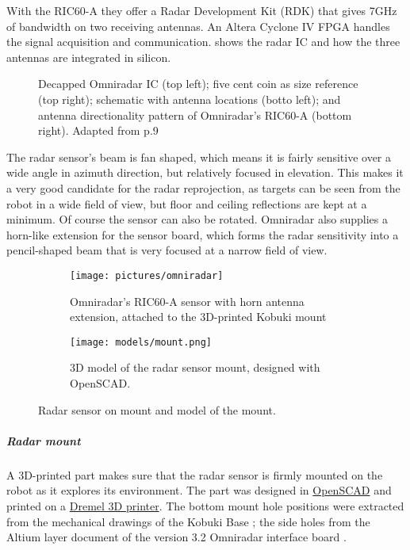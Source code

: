 With the RIC60-A they offer a Radar Development Kit (RDK) that gives
7GHz of bandwidth on two receiving antennas. An Altera Cyclone IV FPGA
handles the signal acquisition and communication.  shows the
radar IC and how the three antennas are integrated in silicon.

\begin{figure}[htbp]
    \centering
    \def\svgwidth{12cm}
    
    \caption{Decapped Omniradar IC (top left); five cent coin as size reference (top right); schematic with antenna locations (botto left); and antenna directionality pattern of Omniradar's RIC60-A (bottom right). Adapted from \cite{Brouwer2015} p.9}
    \label{fig:slide_RIC60A}
\end{figure}

The radar sensor's beam is fan shaped, which means it is fairly
sensitive over a wide angle in azimuth direction, but relatively focused
in elevation. This makes it a very good candidate for the radar
reprojection, as targets can be seen from the robot in a wide field of
view, but floor and ceiling reflections are kept at a minimum. Of course
the sensor can also be rotated. Omniradar also supplies a horn-like
extension for the sensor board, which forms the radar sensitivity into a
pencil-shaped beam that is very focused at a narrow field of view.

\begin{figure}[htbp]
    \centering
    \begin{subfigure}[b]{0.45\textwidth}
        \label{fig:omniradar}
        \texttt{[image: pictures/omniradar]}
        \caption{Omniradar's RIC60-A sensor with horn antenna extension, attached to the 3D-printed Kobuki mount}
    \end{subfigure}
    \hfill
    \begin{subfigure}[b]{0.45\textwidth}
        \centering
        \label{fig:mount}
        \texttt{[image: models/mount.png]}
        \caption{3D model of the radar sensor mount, designed with OpenSCAD.\bigskip}
    \end{subfigure}
    \caption{Radar sensor on mount and model of the mount.}
\end{figure}


\subparagraph{Radar mount}\label{radar-mount}

A 3D-printed part makes sure that the radar sensor is firmly mounted on
the robot as it explores its environment. The part was designed in
\href{http://www.openscad.org/}{OpenSCAD} and printed on a
\href{https://3dprinter.dremel.com/}{Dremel 3D printer}. The bottom
mount hole positions were extracted from the mechanical drawings of the
Kobuki Base \cite{YujinRobot2012}; the side holes from the Altium layer
document of the version 3.2 Omniradar interface board
\cite{Omniradar2014}.

